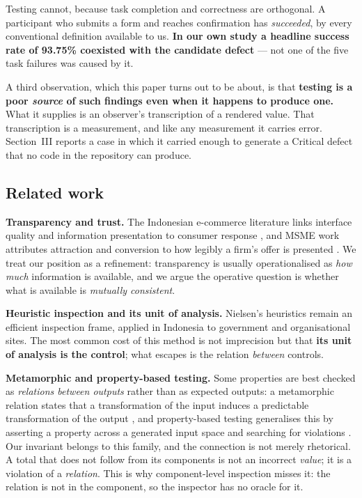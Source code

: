 \documentclass[conference]{IEEEtran}
\begin{document}
Testing cannot, because task completion and correctness are orthogonal. A participant who submits a form
and reaches confirmation has \emph{succeeded}, by every conventional definition available to us.
\textbf{In our own study a headline success rate of 93.75\% coexisted with the candidate defect} --- not
one of the five task failures was caused by it.

A third observation, which this paper turns out to be about, is that \textbf{testing is a poor
\emph{source} of such findings even when it happens to produce one.} What it supplies is an observer's
transcription of a rendered value. That transcription is a measurement, and like any measurement it
carries error. Section~III reports a case in which it carried enough to generate a Critical defect that
no code in the repository can produce.

\subsection{Related work}

\textbf{Transparency and trust.} The Indonesian e-commerce literature links interface quality and
information presentation to consumer response \cite{dinata2023,sunarso2023}, and MSME work attributes
attraction and conversion to how legibly a firm's offer is presented \cite{tianti2024,sunarso2023}.
We treat our position as a refinement: transparency is usually operationalised as \emph{how much}
information is available, and we argue the operative question is whether what is available is
\emph{mutually consistent}.

\textbf{Heuristic inspection and its unit of analysis.} Nielsen's heuristics \cite{nielsen1994} remain
an efficient inspection frame, applied in Indonesia to government \cite{perdanakusuma2022} and
organisational \cite{febriyanthi2021} sites. The most common cost of this method is not imprecision but
that \textbf{its unit of analysis is the control}; what escapes is the relation \emph{between} controls.

\textbf{Metamorphic and property-based testing.} Some properties are best checked as \emph{relations
between outputs} rather than as expected outputs: a metamorphic relation states that a transformation
of the input induces a predictable transformation of the output \cite{chen2003}, and property-based
testing generalises this by asserting a property across a generated input space and searching for
violations \cite{claessen2000}. Our invariant belongs to this family, and the connection is not merely
rhetorical. A total that does not follow from its components is not an incorrect \emph{value}; it is a
violation of a \emph{relation}. This is why component-level inspection misses it: the relation is not in
the component, so the inspector has no oracle for it.
\end{document}
